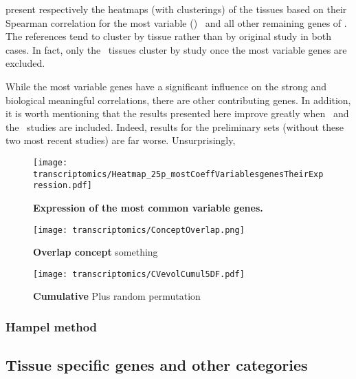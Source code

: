  present
respectively the heatmaps (with clusterings) of the tissues
based on their Spearman correlation for the most variable (\cv) \pcgs\
and all other remaining genes of \setOne.
The references tend to cluster by tissue rather than
by original study in both cases.
In fact, only the \castle\ tissues cluster by study
once the most variable genes are excluded.

While the most variable genes have a significant influence
on the strong and biological meaningful correlations,
there are other contributing genes.
In addition, it is worth mentioning that the results presented here
improve greatly when \uhlen\ and the \gtex\ studies are included.
Indeed, results for the preliminary sets
(without these two most recent studies)
are far worse.
Unsurprisingly, 

\begin{figure}[!htpb]
    \texttt{[image: transcriptomics/Heatmap\_25p\_mostCoeffVariablesgenesTheirExpression.pdf]}\centering
    \caption[Expression of the most common variable genes]{\label{fig:expressionMostvariableG}
    \textbf{Expression of the most common variable genes.} }
\end{figure}


\begin{figure}[!htpb]
    \texttt{[image: transcriptomics/ConceptOverlap.png]}\centering
    \caption[Overlap concept explaination]{\label{fig:overlapConcept}%
    \textbf{Overlap concept} something}
\end{figure}


\begin{figure}[!htpb]
    \texttt{[image: transcriptomics/CVevolCumul5DF.pdf]}\centering
    \caption[Cumulative curve of overlap across the five datasets]%
    {\label{fig:cvEvol5DF}\textbf{Cumulative} Plus random permutation}
\end{figure}





\subsubsection{Hampel method}


\subsection{Tissue specific genes and other categories}\label{subsec:Trans_TissueSpeAndHK}

